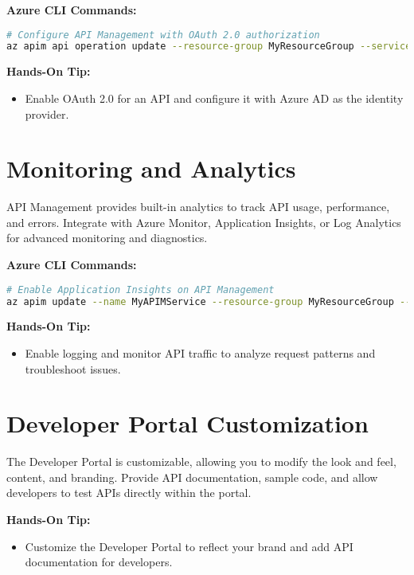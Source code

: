 \documentclass{article}
\begin{document}
\textbf{Azure CLI Commands:}
\begin{lstlisting}[language=bash]
# Configure API Management with OAuth 2.0 authorization
az apim api operation update --resource-group MyResourceGroup --service-name MyAPIMService --api-id myapi --operation-id myoperation --set properties.request.authenticationSettings.oauth2.clientRegistrationName=MyOAuth
\end{lstlisting}

\textbf{Hands-On Tip:}
\begin{itemize}
    \item Enable OAuth 2.0 for an API and configure it with Azure AD as the identity provider.
\end{itemize}

\section{Monitoring and Analytics}
API Management provides built-in analytics to track API usage, performance, and errors. Integrate with Azure Monitor, Application Insights, or Log Analytics for advanced monitoring and diagnostics.

\textbf{Azure CLI Commands:}
\begin{lstlisting}[language=bash]
# Enable Application Insights on API Management
az apim update --name MyAPIMService --resource-group MyResourceGroup --set properties.analytics.enabled=true
\end{lstlisting}

\textbf{Hands-On Tip:}
\begin{itemize}
    \item Enable logging and monitor API traffic to analyze request patterns and troubleshoot issues.
\end{itemize}

\section{Developer Portal Customization}
The Developer Portal is customizable, allowing you to modify the look and feel, content, and branding. Provide API documentation, sample code, and allow developers to test APIs directly within the portal.

\textbf{Hands-On Tip:}
\begin{itemize}
    \item Customize the Developer Portal to reflect your brand and add API documentation for developers.
\end{itemize}
\end{document}
